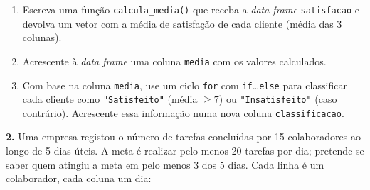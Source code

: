 \documentclass[
  portuguese,
  11pt,
  openany]{book}
\begin{document}
\begin{enumerate}
\def\labelenumi{(\alph{enumi})}
\item
  Escreva uma função \texttt{calcula\_media()} que receba a \emph{data frame} \texttt{satisfacao} e
  devolva um vetor com a média de satisfação de cada cliente (média das 3 colunas).
\item
  Acrescente à \emph{data frame} uma coluna \texttt{media} com os valores calculados.
\item
  Com base na coluna \texttt{media}, use um ciclo \texttt{for} com \texttt{if}\ldots{}\texttt{else} para classificar
  cada cliente como \texttt{"Satisfeito"} (média \(\geq 7\)) ou \texttt{"Insatisfeito"} (caso
  contrário). Acrescente essa informação numa nova coluna \texttt{classificacao}.
\end{enumerate}

\textbf{2.} Uma empresa registou o número de tarefas concluídas por 15 colaboradores ao
longo de 5 dias úteis. A meta é realizar pelo menos 20 tarefas por dia; pretende-se
saber quem atingiu a meta em pelo menos 3 dos 5 dias. Cada linha é um colaborador,
cada coluna um dia:
\end{document}
